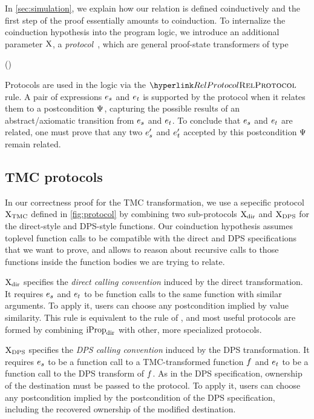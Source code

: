 

In \cref{sec:simulation}, we explain how our relation is defined coinductively and the first step of the proof essentially amounts to coinduction.
To internalize the coinduction hypothesis into the program logic, we introduce an additional parameter $\mathrm{X}$, a \emph{protocol}~\citep*{protocols-2021}, which are general proof-state transformers of type
\begin{mathline}
(\datalangExpr[] \to \datalangExpr[] \to \iProp) \to \datalangExpr[] \to \datalangExpr[] \to \iProp
\end{mathline}

Protocols are used in the logic via the $\RefTirName{RelProtocol}$ rule.
A pair of expressions $\datalangExpr_s$ and $\datalangExpr_t$ is supported by the protocol when it relates them to a postcondition $\Psi$, capturing the possible results of an abstract/axiomatic transition from $\datalangExpr_s$ and $\datalangExpr_t$.
To conclude that $\datalangExpr_s$ and $\datalangExpr_t$ are related, one must prove that any two $\datalangExpr_s'$ and $\datalangExpr_t'$ accepted by this postcondition $\Psi$ remain related.

\subsection{TMC protocols}

In our correctness proof for the TMC transformation, we use a sepecific protocol $\mathrm{X}_\mathrm{TMC}$ defined in \cref{fig:protocol} by combining two sub-protocols $\mathrm{X}_\mathrm{dir}$ and $\mathrm{X}_\mathrm{DPS}$ for the direct-style and DPS-style functions. Our coinduction hypothesis assumes toplevel function calls to be compatible with the direct and DPS specifications that we want to prove, and allows to reason about recursive calls to those functions inside the function bodies we are trying to relate.

$\mathrm{X}_\mathrm{dir}$ specifies the \emph{direct calling convention} induced by the direct transformation.
It requires $\datalangExpr_s$ and $\datalangExpr_t$ to be function calls to the same function with similar arguments.
To apply it, users can choose any postcondition implied by value similarity.
This rule is equivalent to the  rule of \Simuliris, and most useful protocols are formed by combining $\mathrm{iProp}_\mathrm{dir}$ with other, more specialized protocols.

$\mathrm{X}_\mathrm{DPS}$ specifies the \emph{DPS calling convention} induced by the DPS transformation.
It requires $\datalangExpr_s$ to be a function call to a TMC-transformed function $\datalangFn$ and $\datalangExpr_t$ to be a function call to the DPS transform of $\datalangFn$.
As in the DPS specification, ownership of the destination must be passed to the protocol.
To apply it, users can choose any postcondition implied by the postcondition of the DPS specification, including the recovered ownership of the modified destination.

